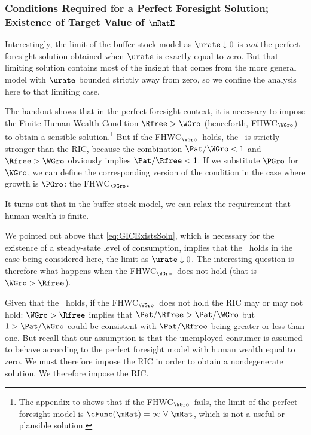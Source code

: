 \documentclass{handout}
\begin{document}
\subsubsection{Conditions Required for a Perfect Foresight Solution; Existence of Target Value of $\mRatE$}

Interestingly, the limit of the buffer stock model as $\urate \downarrow 0$ is {\it not} the perfect foresight solution obtained when $\urate$ is exactly equal to zero.  But that limiting solution contains most of the insight that comes from the more general model with $\urate$ bounded strictly away from zero, so we confine the analysis here to that limiting case. 

\providecommand{\FHWCPGro}{FHWC$_{\PGro}$}
\providecommand{\FHWCWGro}{FHWC$_{\WGro}$}
The handout  shows that in the perfect foresight context, it is necessary to impose the Finite Human Wealth Condition $\Rfree > \WGro$ (henceforth, \FHWCWGro) to obtain a sensible solution.\footnote{The appendix to  shows that if the \FHWCWGro~fails, the limit of the perfect foresight model is $\cFunc(\mRat)=\infty~\forall~\mRat$, which is not a useful or plausible solution.}  But if the \FHWCWGro~holds, the \GICWGro~is strictly stronger than the RIC, because the combination $\Pat/\WGro < 1$ and $\Rfree > \WGro$ obviously implies $\Pat/\Rfree < 1$.  If we substitute $\PGro$ for $\WGro$, we can define the corresponding version of the condition in the case where growth is $\PGro$: the \FHWCPGro.

It turns out that in the buffer stock model, we can relax the requirement that human wealth is finite.  

We pointed out above that \eqref{eq:GICExistsSoln}, which is necessary for the existence of a steady-state level of consumption, implies that the \GICPGro~holds in the case being considered here, the limit as $\urate \downarrow 0$.  The interesting question is therefore what happens when the \FHWCWGro~does not hold (that is $\WGro > \Rfree$).  

Given that the \GICWGro~holds, if the \FHWCWGro~does not hold the RIC may or may not hold:  $\WGro > \Rfree$ implies that $\Pat/\Rfree > \Pat/\WGro$ but $1 > \Pat/\WGro$ could be consistent with $\Pat/\Rfree$ being greater or less than one.  But recall that our assumption is that the unemployed consumer is assumed to behave according to the perfect foresight model with human wealth equal to zero.  We must therefore impose the RIC in order to obtain a nondegenerate solution.  We therefore impose the RIC.
\end{document}
